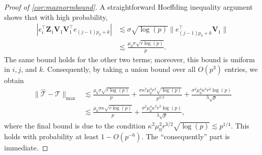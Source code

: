 \documentclass[10pt]{article}
\newcommand{\0}{{\mathbf{0}}}
\newcommand{\1}{{\mathbf{1}}}
\renewcommand{\t}{^{\top}}
\renewcommand{\hat}{\widehat}
\renewcommand{\hat}{\widehat}
\begin{document}
\begin{proof}[Proof of \cref{cor:maxnormbound}]
A straightforward Hoeffding inequality argument shows that with high probability,
\begin{align*}
    |e_i\t \mathbf{Z}_1 \mathbf{V}_1 \mathbf{V}_1\t e_{(j-1)p_3 + k} | &\lesssim \sigma \sqrt{\log(p)} \| e_{(j-1)p_3 + k}\t \mathbf{V}_1 \| \\
    &\lesssim \frac{\mu_0\sigma \sqrt{r\log(p)}  }{p}.
\end{align*}
The same bound holds for the other two terms; moreover, this bound is uniform in $i,j$, and $k$.  Consequently, by taking a union bound over all $O(p^{3})$ entries, we obtain
\begin{align*}
    \| \mathcal{\hat T} - \mathcal{T} \|_{\max} &\lesssim \frac{\mu_0\sigma \sqrt{r\log(p)}  }{p} + \frac{\sigma \kappa^2 \mu_0^3 r^{2} \sqrt{\log(p)}}{p^{3/2}} + \frac{\sigma^2 \mu_0^4 \kappa^3 r^3 \log(p)}{\lambda \sqrt{p}} \\
    &\lesssim \frac{\mu_0\sigma \kappa \sqrt{r\log(p)}  }{p} +  \frac{\sigma^2 \mu_0^4 \kappa^3 r^3 \log(p)}{\lambda \sqrt{p}},
\end{align*}
where the final bound is due to the condition  $\kappa^2 \mu_0^2 r^{3/2} \sqrt{\log(p)} \lesssim p^{1/4}$.  This holds with probability at least $1 - O(p^{-6})$.  The ``consequently'' part is immediate.
\end{proof}
\end{document}
